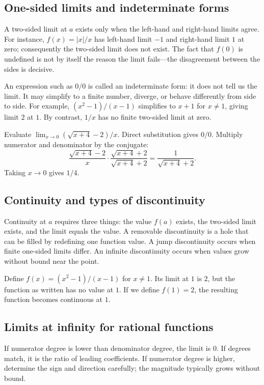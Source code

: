 \documentclass[12pt,a4paper]{article}
\begin{document}
\subsection{One-sided limits and indeterminate forms}
A two-sided limit at $a$ exists only when the left-hand and right-hand limits agree. For instance, $f(x)=|x|/x$ has left-hand limit $-1$ and right-hand limit $1$ at zero; consequently the two-sided limit does not exist. The fact that $f(0)$ is undefined is not by itself the reason the limit fails—the disagreement between the sides is decisive.

An expression such as $0/0$ is called an indeterminate form: it does not tell us the limit. It may simplify to a finite number, diverge, or behave differently from side to side. For example, $(x^2-1)/(x-1)$ simplifies to $x+1$ for $x\ne1$, giving limit $2$ at $1$. By contrast, $1/x$ has no finite two-sided limit at zero.

\begin{exampleBox}Evaluate $\lim_{x\to0}(\sqrt{x+4}-2)/x$. Direct substitution gives $0/0$. Multiply numerator and denominator by the conjugate:
\[
\frac{\sqrt{x+4}-2}{x}\cdot\frac{\sqrt{x+4}+2}{\sqrt{x+4}+2}
=\frac{1}{\sqrt{x+4}+2}.
\]
Taking $x\to0$ gives $1/4$.
\end{exampleBox}

\subsection{Continuity and types of discontinuity}
Continuity at $a$ requires three things: the value $f(a)$ exists, the two-sided limit exists, and the limit equals the value. A removable discontinuity is a hole that can be filled by redefining one function value. A jump discontinuity occurs when finite one-sided limits differ. An infinite discontinuity occurs when values grow without bound near the point.

\begin{exampleBox}Define $f(x)=(x^2-1)/(x-1)$ for $x\ne1$. Its limit at $1$ is $2$, but the function as written has no value at $1$. If we define $f(1)=2$, the resulting function becomes continuous at $1$.
\end{exampleBox}

\subsection{Limits at infinity for rational functions}
If numerator degree is lower than denominator degree, the limit is $0$. If degrees match, it is the ratio of leading coefficients. If numerator degree is higher, determine the sign and direction carefully; the magnitude typically grows without bound.
\end{document}
